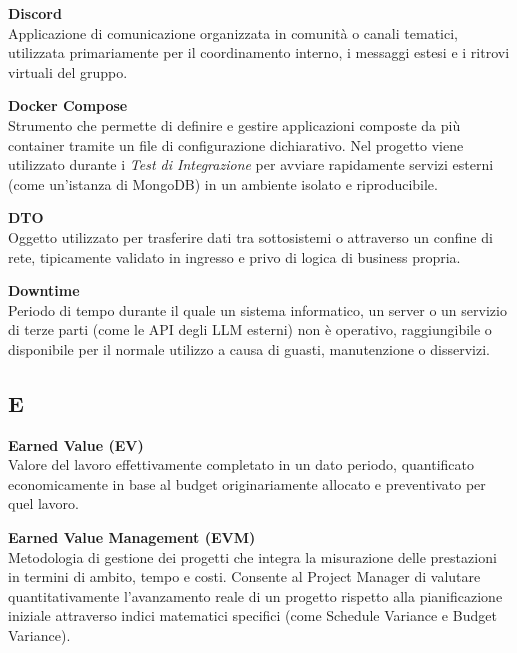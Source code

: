 \documentclass[12pt, a4paper]{article}
\begin{document}
\noindent\hypertarget{discord}{\textbf{Discord}} \\[0.1em]
Applicazione di comunicazione organizzata in comunità o canali tematici, utilizzata primariamente per il coordinamento interno, i messaggi estesi e i ritrovi virtuali del gruppo.
\vspace{0.5cm}

\noindent\hypertarget{docker-compose}{\textbf{Docker Compose}} \\[0.1em]
Strumento che permette di definire e gestire applicazioni composte da più container tramite un file di configurazione dichiarativo. Nel progetto viene utilizzato durante i \textit{Test di Integrazione} per avviare rapidamente servizi esterni (come un'istanza di MongoDB) in un ambiente isolato e riproducibile.
\vspace{0.5cm}

\noindent\hypertarget{dto}{\textbf{DTO}} \\[0.1em]
Oggetto utilizzato per trasferire dati tra sottosistemi o attraverso un confine di rete, tipicamente validato in ingresso e privo di logica di business propria.
\vspace{0.5cm}

\noindent\hypertarget{downtime}{\textbf{Downtime}} \\[0.1em]
Periodo di tempo durante il quale un sistema informatico, un server o un servizio di terze parti (come le API degli LLM esterni) non è operativo, raggiungibile o disponibile per il normale utilizzo a causa di guasti, manutenzione o disservizi.
\vspace{0.1cm}

\newpage
\subsection*{E}
{}
\vspace{0.2cm}

\noindent\hypertarget{earned-value}{\textbf{Earned Value (EV)}} \\[0.1em]
Valore del lavoro effettivamente completato in un dato periodo, quantificato economicamente in base al budget originariamente allocato e preventivato per quel lavoro.
\vspace{0.5cm}

\noindent\hypertarget{earned-value-management}{\textbf{Earned Value Management (EVM)}} \\[0.1em]
Metodologia di gestione dei progetti che integra la misurazione delle prestazioni in termini di ambito, tempo e costi. Consente al Project Manager di valutare quantitativamente l'avanzamento reale di un progetto rispetto alla pianificazione iniziale attraverso indici matematici specifici (come Schedule Variance e Budget Variance).
\vspace{0.5cm}
\end{document}
